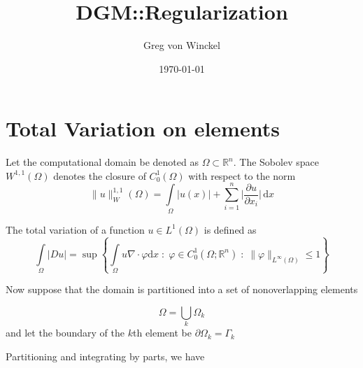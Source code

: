 \documentclass[a4paper,12pt]{article}
\title{DGM::Regularization}
\author{Greg von Winckel}
\date{\today}
\begin{document}
\maketitle
\section{Total Variation on elements}
Let the computational domain be denoted as $\Omega\subset \mathbb{R}^n$.
The Sobolev space $W^{1,1}(\Omega)$ denotes the closure of $C_0^1(\Omega)$ with respect to the norm
\begin{equation}
\|u\|_W^{1,1}(\Omega) = \int\limits_{\Omega} |u(x)|+\sum\limits_{i=1}^n 
\Big|\frac{\partial u}{\partial x_i}\Big|\,\mathrm{d}x
\end{equation}

The total variation of a function $u\in L^1(\Omega)$ is defined as 
\begin{equation}
\int\limits_\Omega |Du|=\sup\left\{\int\limits_{\Omega} u\nabla\cdot\varphi\mathrm{d}x\;:\;
\varphi\in C_0^1(\Omega;\mathbb{R}^n)\;:\;\|\varphi\|_{L^\infty(\Omega)}\leq 1\right\}
\end{equation}

Now suppose that the domain is partitioned into a set of nonoverlapping elements

\[
\Omega = \bigcup_k \Omega_k
\]
and let the boundary of the $k$th element be $\partial\Omega_k=\Gamma_k$

Partitioning and integrating by parts, we have
\end{document}
